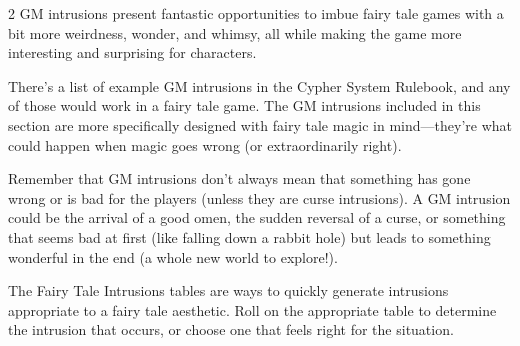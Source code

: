 \begin{multicols}{2}
GM intrusions present fantastic opportunities to imbue fairy tale games with a bit more weirdness, wonder, and whimsy, all while making the game more interesting and surprising for characters.

There’s a list of example GM intrusions in the Cypher System Rulebook, and any of those would work in a fairy tale game. The GM intrusions included in this section are more specifically designed with fairy tale magic in mind—they’re what could happen when magic goes wrong (or extraordinarily right).

Remember that GM intrusions don’t always mean that something has gone wrong or is bad for the players (unless they are curse intrusions). A GM intrusion could be the arrival of a good omen, the sudden reversal of a curse, or something that seems bad at first (like falling down a rabbit hole) but leads to something wonderful in the end (a whole new world to explore!).

The Fairy Tale Intrusions tables are ways to quickly generate intrusions appropriate to a fairy tale aesthetic. Roll on the appropriate table to determine the intrusion that occurs, or choose one that feels right for the situation.

\end{multicols}

